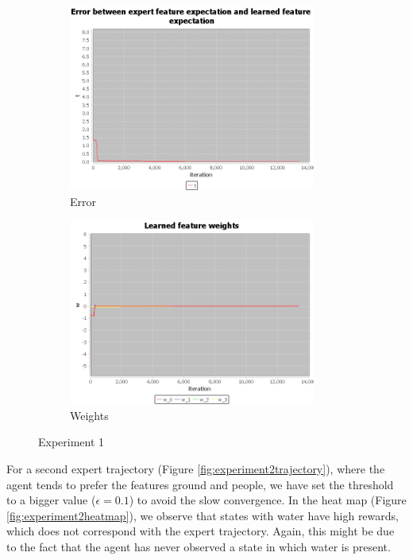 \documentclass[10pt,a4paper,twocolumn]{article}
\begin{document}
\begin{figure}[h]
\begin{subfigure}[b]{0.5\textwidth}
	\includegraphics[width=\textwidth]{experiment_1_t}
	\caption{Error}
	\label{fig:experiment1t}
\end{subfigure}
\begin{subfigure}[b]{0.5\textwidth}
	\includegraphics[width=\textwidth]{experiment_1_w}
	\caption{Weights}
	\label{fig:experiment1w}
\end{subfigure}
\caption{Experiment 1}
\end{figure}

For a second expert trajectory (Figure \ref{fig:experiment2trajectory}), where the agent tends to prefer the features ground and people, we have set the threshold to a bigger value ($\epsilon= 0.1$) to avoid the slow convergence. In the heat map (Figure \ref{fig:experiment2heatmap}), we observe that states with water have high rewards, which does not correspond with the expert trajectory. Again, this might be due to the fact that the agent has never observed a state in which water is present.
\end{document}
